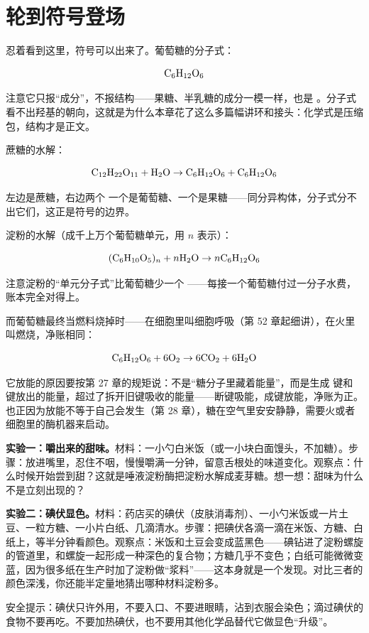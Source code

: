 \section{轮到符号登场}

忍着看到这里，符号可以出来了。葡萄糖的分子式：

\[\mathrm{C_6H_{12}O_6}\]

注意它只报“成分”，不报结构——果糖、半乳糖的成分一模一样，也是 。分子式看不出羟基的朝向，这就是为什么本章花了这么多篇幅讲环和接头：化学式是压缩包，结构才是正文。

蔗糖的水解：

\[\mathrm{C_{12}H_{22}O_{11}} + \mathrm{H_2O} \rightarrow \mathrm{C_6H_{12}O_6} + \mathrm{C_6H_{12}O_6}\]

左边是蔗糖，右边两个  一个是葡萄糖、一个是果糖——同分异构体，分子式分不出它们，这正是符号的边界。

淀粉的水解（成千上万个葡萄糖单元，用 $n$ 表示）：

\[(\mathrm{C_6H_{10}O_5})_n + n\mathrm{H_2O} \rightarrow n\mathrm{C_6H_{12}O_6}\]

注意淀粉的“单元分子式”比葡萄糖少一个 ——每接一个葡萄糖付过一分子水费，账本完全对得上。

而葡萄糖最终当燃料烧掉时——在细胞里叫细胞呼吸（第 52 章起细讲），在火里叫燃烧，净账相同：

\[\mathrm{C_6H_{12}O_6} + 6\mathrm{O_2} \rightarrow 6\mathrm{CO_2} + 6\mathrm{H_2O}\]

它放能的原因要按第 27 章的规矩说：不是“糖分子里藏着能量”，而是生成  键和  键放出的能量，超过了拆开旧键吸收的能量——断键吸能，成键放能，净账为正。也正因为放能不等于自己会发生（第 28 章），糖在空气里安安静静，需要火或者细胞里的酶机器来启动。

\begin{shiyan}
\textbf{实验一：嚼出来的甜味。}材料：一小勺白米饭（或一小块白面馒头，不加糖）。步骤：放进嘴里，忍住不咽，慢慢嚼满一分钟，留意舌根处的味道变化。观察点：什么时候开始尝到甜？这就是唾液淀粉酶把淀粉水解成麦芽糖。想一想：甜味为什么不是立刻出现的？

\textbf{实验二：碘伏显色。}材料：药店买的碘伏（皮肤消毒剂）、一小勺米饭或一片土豆、一粒方糖、一小片白纸、几滴清水。步骤：把碘伏各滴一滴在米饭、方糖、白纸上，等半分钟看颜色。观察点：米饭和土豆会变成蓝黑色——碘钻进了淀粉螺旋的管道里，和螺旋一起形成一种深色的复合物；方糖几乎不变色；白纸可能微微变蓝，因为很多纸在生产时加了淀粉做“浆料”——这本身就是一个发现。对比三者的颜色深浅，你还能半定量地猜出哪种材料淀粉多。

安全提示：碘伏只许外用，不要入口、不要进眼睛，沾到衣服会染色；滴过碘伏的食物不要再吃。不要加热碘伏，也不要用其他化学品替代它做显色“升级”。
\end{shiyan}


